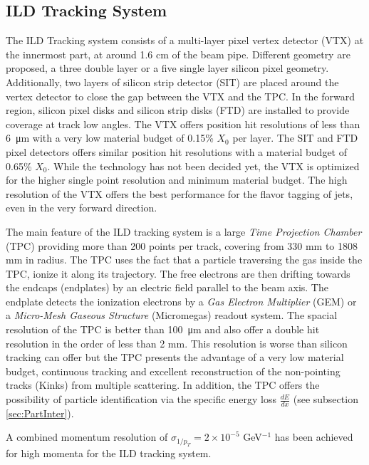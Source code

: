 \subsection{ILD Tracking System}

The ILD Tracking system consists of a multi-layer pixel vertex detector (VTX) at the innermost part, at around 1.6 cm of the beam pipe. Different geometry are proposed, a three double layer or a five single layer silicon pixel geometry. Additionally, two layers of silicon strip detector (SIT) are placed around the vertex detector to close the gap between the VTX and the TPC. In the forward region, silicon pixel disks and silicon strip disks (FTD) are installed to provide coverage at track low angles. The VTX offers position hit resolutions of less than \SI{6}{\micro\meter} with a very low material budget of 0.15\% $X_0$ per layer. The SIT and FTD pixel detectors offers similar position hit resolutions with a material budget of 0.65\% $X_0$. While the technology has not been decided yet, the VTX is optimized for the higher single point resolution and minimum material budget. The high resolution of the VTX offers the best performance for the flavor tagging of jets, even in the very forward direction.

The main feature of the ILD tracking system is a large \textit{Time Projection Chamber} (TPC) providing more than 200 points per track, covering from 330 mm to 1808 mm in radius. The TPC uses the fact that a particle traversing the gas inside the TPC, ionize it along its trajectory. The free electrons are then drifting towards the endcaps (endplates) by an electric field parallel to the beam axis. The endplate detects the ionization electrons by a \textit{Gas Electron Multiplier} (GEM) or a \textit{Micro-Mesh Gaseous Structure} (Micromegas) readout system. The spacial resolution of the TPC is better than \SI{100}{\micro\meter} and also offer a double hit resolution in the order of less than 2 mm. This resolution is worse than silicon tracking can offer but the TPC presents the advantage of a very low material budget, continuous tracking and excellent reconstruction of the non-pointing tracks (Kinks) from multiple scattering. In addition, the TPC offers the possibility of particle identification via the specific energy loss $\frac{dE}{dx}$ (see subsection \ref{sec:PartInter}).

A combined momentum resolution of $\sigma_{1/p_T} = 2 \times 10^{-5}$ GeV$^{-1}$ has been achieved for high momenta for the ILD tracking system.

